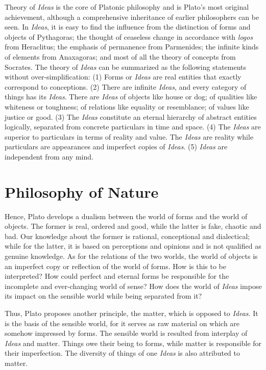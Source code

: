 \documentclass[11pt]{article}
\begin{document}
\begin{sloppypar}
Theory of \textit{Ideas} is the core of Platonic philosophy and is Plato’s most original achievement, although a comprehensive inheritance of earlier philosophers can be seen. 
In \textit{Ideas}, it is easy to find the influence from the distinction of forms and objects of Pythagoras; 
the thought of ceaseless change in accordance with \textit{logos} from Heraclitus; 
the emphasis of permanence from Parmenides; 
the infinite kinds of elements from Anaxagoras; 
and most of all the theory of concepts from Socrates. 
The theory of \textit{Ideas} can be summarized as the following statements without over-simplification: 
(1) Forms or \textit{Ideas} are real entities that exactly correspond to conceptions. 
(2) There are infinite \textit{Ideas}, and every category of things has its \textit{Ideas}. 
There are \textit{Ideas} of objects like house or dog; 
of qualities like whiteness or toughness; 
of relations like equality or resemblance; 
of values like justice or good. 
(3) The \textit{Ideas} constitute an eternal hierarchy of abstract entities logically, separated from concrete particulars in time and space. 
(4) The \textit{Ideas} are superior to particulars in terms of reality and value. 
The \textit{Ideas} are reality while particulars are appearances and imperfect copies of \textit{Ideas}. 
(5) \textit{Ideas} are independent from any mind.
  
\section{Philosophy of Nature}
Hence, Plato develops a dualism between the world of forms and the world of objects. 
The former is real, ordered and good, while the latter is fake, chaotic and bad. 
Our knowledge about the former is rational, conceptional and dialectical; 
while for the latter, it is based on perceptions and opinions and is not qualified as genuine knowledge. 
As for the relations of the two worlds, the world of objects is an imperfect copy or reflection of the world of forms. 
How is this to be interpreted? 
How could perfect and eternal forms be responsible for the incomplete and ever-changing world of sense? 
How does the world of \textit{Ideas} impose its impact on the sensible world while being separated from it?

\newline

Thus, Plato proposes another principle, the matter, which is opposed to \textit{Ideas}. 
It is the basis of the sensible world, for it serves as raw material on which are somehow impressed by forms. 
The sensible world is resulted from interplay of \textit{Ideas} and matter. 
Things owe their being to forms, while matter is responsible for their imperfection. 
The diversity of things of one \textit{Ideas} is also attributed to matter. 


\end{sloppypar}
\end{document}
